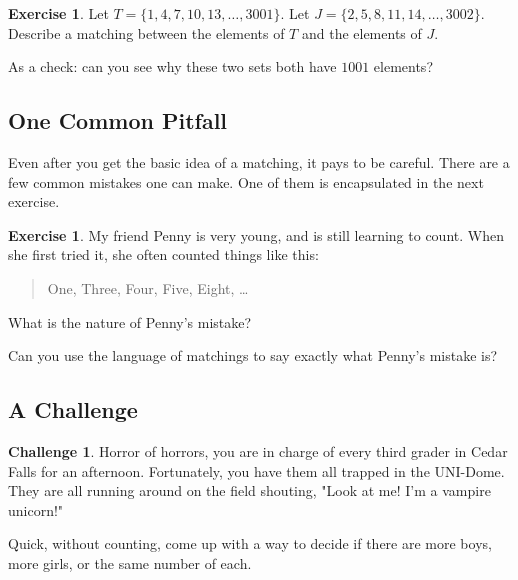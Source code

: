 \documentclass[12pt,letterpaper]{article}
\theoremstyle{definition}
\newtheorem{exercise}[question]{Exercise}
\newtheorem*{challenge}{Challenge}
\begin{document}
\begin{exercise}
Let $T = \{ 1, 4, 7, 10, 13, \ldots, 3001\}$.
Let $J = \{ 2, 5, 8, 11, 14, \ldots, 3002\}$.
Describe a matching between the elements of $T$ and the elements of $J$.

As a check: can you see why these two sets both have $1001$ elements?
\end{exercise}

\subsection*{One Common Pitfall}

Even after you get the basic idea of a matching, it pays to be careful. 
There are a few common mistakes one can make. 
One of them is encapsulated in the next exercise.

\begin{exercise}
My friend Penny is very young, and is still learning to count.
When she first tried it, she often counted things like this:
\begin{quote}
One, Three, Four, Five, Eight, \dots
\end{quote}
What is the nature of Penny's mistake?

Can you use the language of matchings to say exactly what Penny's mistake is?
\end{exercise}

\subsection*{A Challenge}

\begin{challenge}
Horror of horrors, you are in charge of every third grader in Cedar Falls for an afternoon.
Fortunately, you have them all trapped in the UNI-Dome.
They are all running around on the field shouting, "Look at me! I'm a vampire unicorn!"

Quick, without counting, come up with a way to decide if there are more boys, more girls, or the same number of each.
\end{challenge}

\end{document}
